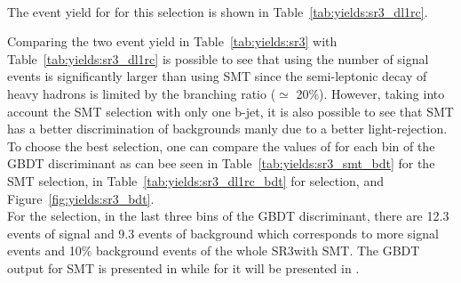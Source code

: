 \\The event yield for  for this selection is shown in Table~\ref{tab:yields:sr3_dl1rc}.
\begin{table}[!h]
	\centering
	\small
	
	\caption{Total event yield for the SR3\tZc selection using the \Pqc-tagger \DLrc.}
\label{tab:yields:sr3_dl1rc}
\end{table}  
\newline \noindent Comparing the two event yield in Table~\ref{tab:yields:sr3} with Table~\ref{tab:yields:sr3_dl1rc} is possible to see that using \DLrc the number of signal events is significantly larger than using SMT since the semi-leptonic decay of heavy hadrons is limited by the branching ratio ($\simeq$ 20\%).
However, taking into account the SMT selection with only one b-jet, it is also possible to see that SMT has a better discrimination of backgrounds manly due to a better light-rejection.\\
To choose the best selection, one can compare the values of \ssplusb for each bin of the GBDT discriminant as can bee seen in Table~\ref{tab:yields:sr3_smt_bdt} for the SMT selection, in Table~\ref{tab:yields:sr3_dl1rc_bdt} for \DLrc selection, and Figure~\ref{fig:yields:sr3_bdt}.\\
For the \DLrc selection, in the last three bins of the GBDT discriminant, there are
12.3 events of signal and 9.3 events of background 
which corresponds to more signal events and 10\% background events of the whole SR3\tZc with SMT. The GBDT output for SMT is presented in  while for \DLrc it will be presented in .

